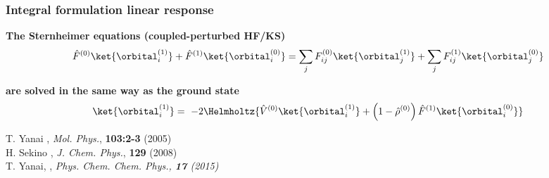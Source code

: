 
\begin{frame}
    \frametitle{Integral formulation linear response}
    \centering
    \textbf{The Sternheimer equations (coupled-perturbed HF/KS)}
    \begin{equation}
        \nonumber
        \hat{F}^{(0)}\ket{\orbital_i^{(1)}} + \hat{F}^{(1)}\ket{\orbital_i^{(0)}} = 
        \sum_jF_{ij}^{(0)}\ket{\orbital_j^{(1)}} + \sum_j F_{ij}^{(1)}\ket{\orbital_j^{(0)}}
    \end{equation}

    \vspace{10mm}

    \textbf{are solved in the same way as the ground state}
    \begin{align}
        \nonumber
        \ket{\orbital_i^{(1)}} =\
        -2\Helmholtz{\hat{V}^{(0)}\ket{\orbital_i^{(1)}}
        + \left(1 - \hat{\rho}^{(0)}\right)\hat{F}^{(1)}\ket{\orbital_i^{(0)}}}
    \end{align}

\vspace{5mm}
\centering
\tiny
T. Yanai \etal,
{\it Mol. Phys.},
\textbf{103:2-3} 
(2005)\\
H. Sekino \etal,
{\it J. Chem. Phys.},
\textbf{129} 
(2008)\\
T. Yanai, \etal,
\it{Phys. Chem. Chem. Phys.}, 
\textbf{17}
(2015)

\end{frame}

